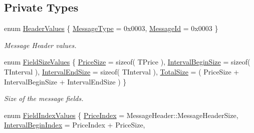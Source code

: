 \subsection*{Private Types}
\begin{DoxyCompactItemize}
\item 
enum \hyperlink{class_terra_swarm_1_1_synchronous_1_1_price_proposal_a14b7d0d8b5050be599045136920effcb}{Header\-Values} \{ \hyperlink{class_terra_swarm_1_1_synchronous_1_1_price_proposal_a14b7d0d8b5050be599045136920effcba3dc295e632080af4b40c9cae3fedb652}{Message\-Type} = 0x0003, 
\hyperlink{class_terra_swarm_1_1_synchronous_1_1_price_proposal_a14b7d0d8b5050be599045136920effcba25ac9ca714a292c6464dac12d0218784}{Message\-Id} = 0x0003
 \}
\begin{DoxyCompactList}\small\item\em Message Header values. \end{DoxyCompactList}\item 
enum \hyperlink{class_terra_swarm_1_1_synchronous_1_1_price_proposal_ab2ea7dd828cca1f7635018608f595f0b}{Field\-Size\-Values} \{ \hyperlink{class_terra_swarm_1_1_synchronous_1_1_price_proposal_ab2ea7dd828cca1f7635018608f595f0bad6e9c96f5e6fdabf253684805f19dfd5}{Price\-Size} = sizeof( T\-Price ), 
\hyperlink{class_terra_swarm_1_1_synchronous_1_1_price_proposal_ab2ea7dd828cca1f7635018608f595f0ba2482e22b3b67744f6bb178b36cdc1b91}{Interval\-Begin\-Size} = sizeof( T\-Interval ), 
\hyperlink{class_terra_swarm_1_1_synchronous_1_1_price_proposal_ab2ea7dd828cca1f7635018608f595f0ba1481cf2a5350361d2fbc2f166ede8c19}{Interval\-End\-Size} = sizeof( T\-Interval ), 
\hyperlink{class_terra_swarm_1_1_synchronous_1_1_price_proposal_ab2ea7dd828cca1f7635018608f595f0ba0b3fff38e992055c068ed344b9e956de}{Total\-Size} = ( Price\-Size + Interval\-Begin\-Size + Interval\-End\-Size )
 \}
\begin{DoxyCompactList}\small\item\em Size of the message fields. \end{DoxyCompactList}\item 
enum \hyperlink{class_terra_swarm_1_1_synchronous_1_1_price_proposal_a32c76156dee2511c9aa14a90995639c8}{Field\-Index\-Values} \{ \hyperlink{class_terra_swarm_1_1_synchronous_1_1_price_proposal_a32c76156dee2511c9aa14a90995639c8a7c993b52da3545f122e21da28f769e64}{Price\-Index} = Message\-Header\-:\-:Message\-Header\-Size, 
\hyperlink{class_terra_swarm_1_1_synchronous_1_1_price_proposal_a32c76156dee2511c9aa14a90995639c8abadfb7fce0950c70240c2687de80a253}{Interval\-Begin\-Index} = Price\-Index + Price\-Size, 

\end{DoxyCompactItemize}
